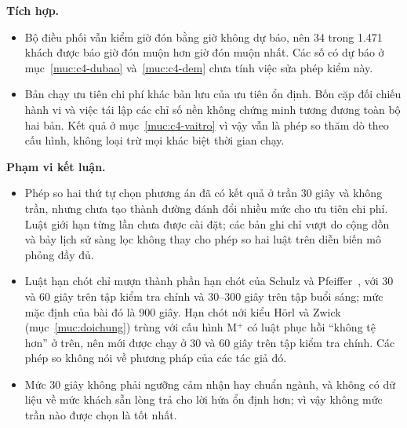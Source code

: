 \textbf{Tích hợp.}
\begin{itemize}[leftmargin=1.2cm,itemsep=2pt,topsep=3pt]
\item Bộ điều phối vẫn kiểm giờ đón bằng giờ không dự báo, nên 34 trong 1.471 khách được báo giờ đón muộn hơn giờ đón
muộn nhất. Các số có dự báo ở mục~\ref{muc:c4-dubao} và~\ref{muc:c4-dem} chưa tính việc sửa phép kiểm này.
\item Bản chạy ưu tiên chi phí khác bản lưu của ưu tiên ổn định. Bốn cặp đối chiếu hành vi và việc tái lập các
chỉ số nền không chứng minh tương đương toàn bộ hai bản. Kết quả ở mục~\ref{muc:c4-vaitro} vì vậy vẫn là phép so
thăm dò theo cấu hình, không loại trừ mọi khác biệt thời gian chạy.
\end{itemize}

\textbf{Phạm vi kết luận.}
\begin{itemize}[leftmargin=1.2cm,itemsep=2pt,topsep=3pt]
\item Phép so hai thứ tự chọn phương án đã có kết quả ở trần 30 giây và không trần, nhưng chưa tạo thành
đường đánh đổi nhiều mức cho ưu tiên chi phí. Luật giới hạn từng lần chưa được cài đặt; các bản ghi chỉ vượt do
cộng dồn và bảy lịch sử sàng lọc không thay cho phép so hai luật trên diễn biến mô phỏng đầy đủ.
\item Luật hạn chót chỉ mượn thành phần hạn chót của Schulz và Pfeiffer~\cite{schulz2026}, với 30 và 60 giây trên tập
kiểm tra chính và 30--300 giây trên tập buổi sáng; mức mặc định của bài đó là 900 giây. Hạn chót nới kiểu Hörl và
Zwick~\cite{horl2022} (mục~\ref{muc:doichung}) trùng với cấu hình M$^{+}$ có luật phục hồi ``không tệ hơn'' ở trên,
nên mới được chạy ở 30 và 60 giây trên tập kiểm tra chính. Các phép so không nói về phương pháp của các tác giả đó.
\item Mức 30 giây không phải ngưỡng cảm nhận hay chuẩn ngành, và không có dữ liệu về mức khách sẵn lòng trả cho lời
hứa ổn định hơn; vì vậy không mức trần nào được chọn là tốt nhất.
\end{itemize}
